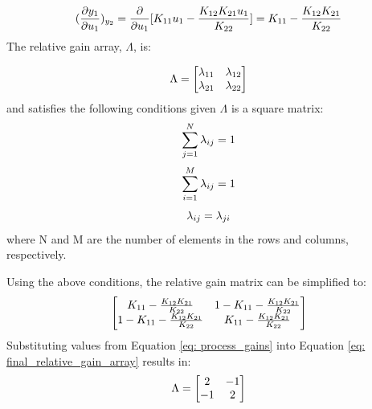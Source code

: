 \begin{equation}
    \centering
        (\frac{\partial y_1}{\partial u_1})_{y_2} = \frac{\partial}{\partial u_1}[K_{11}u_1 - \frac{K_{12}K_{21}u_1}{K_{22}}] = K_{11} - \frac{K_{12}K_{21}}{K_{22}}
\end{equation}
The relative gain array, $\Lambda$, is:

\begin{equation}
    \centering
    \Lambda = 
    \begin{bmatrix}
    \lambda_{11}   &   \lambda_{12}   \\
    \lambda_{21}   &   \lambda_{22}
    \end{bmatrix}
\end{equation}
and satisfies the following conditions given $\Lambda$ is a square matrix:
{
\begin{equation}
    \centering
    \sum_{j = 1}^N \lambda_{ij} = 1
\end{equation}
\begin{equation}
    \centering
    \sum_{i = 1}^M \lambda_{ij} = 1
\end{equation}
\begin{equation}
    \centering
    \lambda_{ij} = \lambda_{ji}
\end{equation}}
where N and M are the number of elements in the rows and columns, respectively.

\noindent
Using the above conditions, the relative gain matrix can be simplified to:
\begin{equation}
    \centering
    \begin{bmatrix}
     K_{11} - \frac{K_{12}K_{21}}{K_{22}}   &   1 - K_{11} - \frac{K_{12}K_{21}}{K_{22}}   \\
     1 - K_{11} - \frac{K_{12}K_{21}}{K_{22}}   &   K_{11} - \frac{K_{12}K_{21}}{K_{22}}
    \end{bmatrix}
    \label{eq: final_relative_gain_array}
\end{equation}
Substituting values from Equation \ref{eq: process_gains} into Equation \ref{eq: final_relative_gain_array} results in:
\begin{equation}
    \centering
    \Lambda = 
    \begin{bmatrix}
     2   &   -1   \\
     -1  &    2
    \end{bmatrix}
    \label{eq: relative_gain_array_w_values}
\end{equation}

